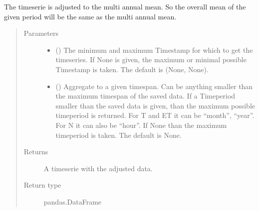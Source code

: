 \documentclass[letterpaper,10pt,english]{sphinxmanual}
\begin{document}
\begin{fulllineitems}
\begin{fulllineitems}
\sphinxAtStartPar
The timeserie is adjusted to the multi annual mean.
So the overall mean of the given period will be the same as the multi annual mean.
\begin{quote}\begin{description}
\item[{Parameters}] \leavevmode\begin{itemize}
\item {} 
\sphinxAtStartPar
{} ({\hyperref[\detokenize{weatherDB.lib:weatherDB.lib.utils.TimestampPeriod}]{}}\sphinxstyleliteralemphasis{\sphinxupquote{(}}\sphinxstyleliteralemphasis{\sphinxupquote{)}}\sphinxstyleliteralemphasis{\sphinxupquote{, }}) \textendash{} The minimum and maximum Timestamp for which to get the timeseries.
If None is given, the maximum or minimal possible Timestamp is taken.
The default is (None, None).

\item {} 
\sphinxAtStartPar
{} (\sphinxstyleliteralemphasis{\sphinxupquote{, }}) \textendash{} Aggregate to a given timespan.
Can be anything smaller than the maximum timespan of the saved data.
If a Timeperiod smaller than the saved data is given, than the maximum possible timeperiod is returned.
For T and ET it can be “month”, “year”.
For N it can also be “hour”.
If None than the maximum timeperiod is taken.
The default is None.

\end{itemize}

\item[{Returns}] \leavevmode
\sphinxAtStartPar
A timeserie with the adjusted data.

\item[{Return type}] \leavevmode
\sphinxAtStartPar
pandas.DataFrame

\end{description}\end{quote}

\end{fulllineitems}


\end{fulllineitems}
\end{document}
